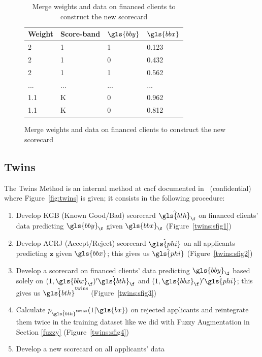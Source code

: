 \begin{table}
{\begin{multicols}{3}
\columnbreak

\begin{subfigure}[t]{0.31\textwidth}
\begin{center}
\begin{adjustbox}{max width=0.95\textwidth}

\begin{tabular}{l l l l}
\toprule
\textbf{Weight} & \textbf{Score-band} & \textbf{${\gls{bby}}$} & \textbf{${\gls{bbx}}$}\\
\midrule
2 & 1 & 1 & 0.123 \\
2 & 1 & 0 & 0.432 \\
2 & 1 & 1 & 0.562 \\
... & ... & ... & ... \\
1.1 & K & 0 & 0.962 \\
1.1 & K & 0 & 0.812 \\
\bottomrule
\end{tabular}
\end{adjustbox}
\end{center}

\caption{Merge weights and data on financed clients to construct the new scorecard}
\label{augment:sfig3}
\end{subfigure}
\end{multicols}
}
\end{table}

\subsection{Twins} \label{Twins}

The Twins Method is an internal method at \gls{cacf} documented in~\cite{groupe} (confidential) where Figure~\ref{fig:twins} is given; it consists in the following procedure:
\begin{enumerate}
\item Develop KGB (Known Good/Bad) scorecard $\hat{\gls{bth}}_\f$ on financed clients' data predicting $\gls{bby}_\f$ given $\gls{bbx}_\f$ (Figure~\ref{twins:sfig1})
\item Develop ACRJ (Accept/Reject) scorecard $\hat{\gls{phi}}$ on all applicants predicting $\mathbf{\bm{z}}$ given $\gls{bbx}$; this gives us $\hat{\gls{phi}}$ (Figure~\ref{twins:sfig2})
\item Develop a scorecard on financed clients' data predicting $\gls{bby}_\f$ based solely on $(1,\gls{bbx}_\f)' \hat{\gls{bth}}_\f$ and $(1,\gls{bbx}_\f)' \hat{\gls{phi}}$; this gives us $\hat{\gls{bth}}^{\text{twins}}$ (Figure~\ref{twins:sfig3})
\item Calculate $p_{\hat{\gls{bth}}^{\text{twins}}}(1 | \gls{bx})$ on rejected applicants and reintegrate them twice in the training dataset like we did with Fuzzy Augmentation in Section \ref{fuzzy} (Figure~\ref{twins:sfig4})
\item Develop a new scorecard on all applicants' data
\end{enumerate}

